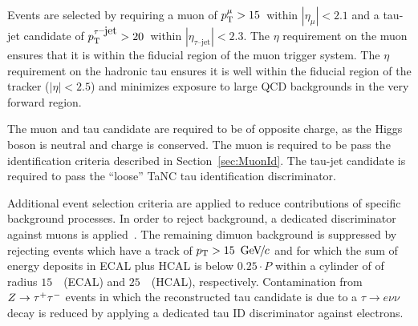 Events are selected by requiring a muon of $p_{\mathrm{T}}^{\mu} > 15$~\GeVc within $
\left| \eta_{\mu} \right| < 2.1$ and a tau-jet candidate of
$p_{\mathrm{T}}^{\tau\mbox{--jet}} > 20$~\GeVc within $|\eta_{\tau\mbox{--jet}}| < 2.3$.
The $\eta$ requirement on the muon ensures that it is within the fiducial region
of the muon trigger system.  The $\eta$ requirement on the hadronic tau ensures
it is well within the fiducial region of the tracker ($|\eta| < 2.5$) and
minimizes exposure to large QCD backgrounds in the very forward region.

The muon and tau candidate are required to be of opposite charge, as the
Higgs boson is neutral and charge is conserved.  The muon is required to be pass the
identification criteria described in Section~\ref{sec:MuonId}.   The tau-jet
candidate is required to pass the ``loose'' TaNC tau identification
discriminator. 

Additional event selection criteria are applied to reduce contributions of
specific background processes. In order to reject \ZMM background, a dedicated
discriminator against muons is applied~\cite{CMS-PAS-PFT-08-001}. The remaining
dimuon background is suppressed by rejecting events which have a track of $p_{\mathrm{T}}
> 15~{\,\text{Ge\hspace{-.08em}V\hspace{-0.16em}/\hspace{-0.08em}}c}$ and for which the sum of energy deposits in ECAL plus HCAL is below
$0.25 \cdot P$ within a cylinder of of radius $15$~\centi\meter~(ECAL) and
$25$~\centi\meter~(HCAL), respectively.  Contamination from $Z \to \tau^+\tau^-$ events
in which the reconstructed tau candidate is due to a $\tau \to e \nu \nu$
decay is reduced by applying a dedicated tau ID discriminator against electrons.

